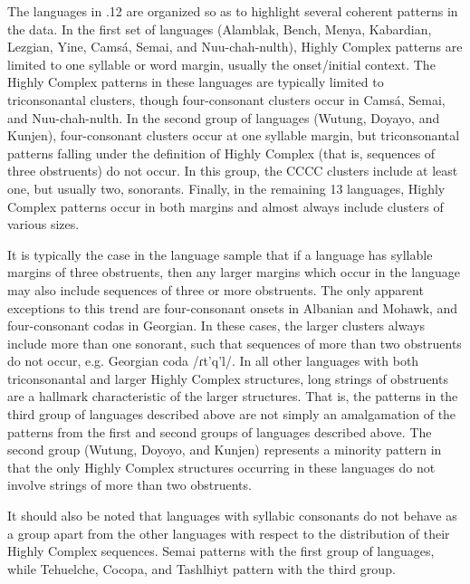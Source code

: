   The languages in .12 are organized so as to highlight several coherent patterns in the data. In the first set of languages (Alamblak, Bench, Menya, Kabardian, Lezgian, Yine, Camsá, Semai, and Nuu-chah-nulth), Highly Complex patterns are limited to one syllable or word margin, usually the onset/initial context. The Highly Complex patterns in these languages are typically limited to triconsonantal clusters, though four-consonant clusters occur in Camsá, Semai, and Nuu-chah-nulth. In the second group of languages (Wutung, Doyayo, and Kunjen), four-consonant clusters occur at one syllable margin, but triconsonantal patterns falling under the definition of Highly Complex (that is, sequences of three obstruents) do not occur. In this group, the CCCC clusters include at least one, but usually two, sonorants. Finally, in the remaining 13 languages, Highly Complex patterns occur in both margins and almost always include clusters of various sizes.

  It is typically the case in the language sample that if a language has syllable margins of three obstruents, then any larger margins which occur in the language may also include sequences of three or more obstruents. The only apparent exceptions to this trend are four-consonant onsets in Albanian and Mohawk, and four-consonant codas in Georgian. In these cases, the larger clusters always include more than one sonorant, such that sequences of more than two obstruents do not occur, e.g. Georgian coda /ɾt’q’l/. In all other languages with both triconsonantal and larger Highly Complex structures, long strings of obstruents are a hallmark characteristic of the larger structures. That is, the patterns in the third group of languages described above are not simply an amalgamation of the patterns from the first and second groups of languages described above. The second group (Wutung, Doyoyo, and Kunjen) represents a minority pattern in that the only Highly Complex structures occurring in these languages do not involve strings of more than two obstruents.

  It should also be noted that languages with syllabic consonants do not behave as a group apart from the other languages with respect to the distribution of their Highly Complex sequences. Semai patterns with the first group of languages, while Tehuelche, Cocopa, and Tashlhiyt pattern with the third group.

